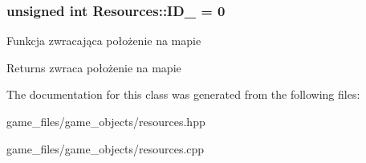 \subsubsection[{\texorpdfstring{I\+D\+\_\+}{ID_}}]{\setlength{\rightskip}{0pt plus 5cm}unsigned int Resources\+::\+I\+D\+\_\+ = 0\hspace{0.3cm}{\ttfamily [static]}}\hypertarget{classResources_a0e8bde75030b9818a78df8ded58e5998}{}\label{classResources_a0e8bde75030b9818a78df8ded58e5998}
Funkcja zwracająca położenie na mapie \begin{DoxyReturn}{Returns}
zwraca położenie na mapie 
\end{DoxyReturn}


The documentation for this class was generated from the following files\+:\begin{DoxyCompactItemize}
\item 
game\+\_\+files/game\+\_\+objects/resources.\+hpp\item 
game\+\_\+files/game\+\_\+objects/resources.\+cpp\end{DoxyCompactItemize}
